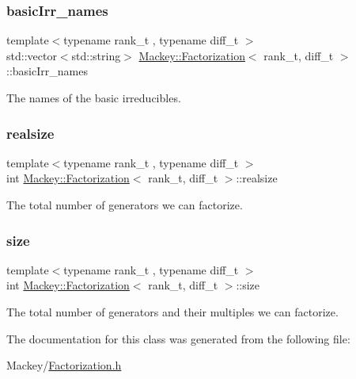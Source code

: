 \subsubsection{\texorpdfstring{basic\+Irr\+\_\+names}{basicIrr\_names}}
{\footnotesize\ttfamily template$<$typename rank\+\_\+t , typename diff\+\_\+t $>$ \\
std\+::vector$<$std\+::string$>$ \hyperlink{classMackey_1_1Factorization}{Mackey\+::\+Factorization}$<$ rank\+\_\+t, diff\+\_\+t $>$\+::basic\+Irr\+\_\+names}



The names of the basic irreducibles. 

\mbox{\label{classMackey_1_1Factorization_af5f29d56f33e4835aa699d9d6708b6c8}} 
\subsubsection{\texorpdfstring{realsize}{realsize}}
{\footnotesize\ttfamily template$<$typename rank\+\_\+t , typename diff\+\_\+t $>$ \\
int \hyperlink{classMackey_1_1Factorization}{Mackey\+::\+Factorization}$<$ rank\+\_\+t, diff\+\_\+t $>$\+::realsize}



The total number of generators we can factorize. 

\mbox{\label{classMackey_1_1Factorization_ab958c9491e2e63d0861d92599b0d237d}} 
\subsubsection{\texorpdfstring{size}{size}}
{\footnotesize\ttfamily template$<$typename rank\+\_\+t , typename diff\+\_\+t $>$ \\
int \hyperlink{classMackey_1_1Factorization}{Mackey\+::\+Factorization}$<$ rank\+\_\+t, diff\+\_\+t $>$\+::size}



The total number of generators and their multiples we can factorize. 



The documentation for this class was generated from the following file\+:\begin{DoxyCompactItemize}
\item 
Mackey/\hyperlink{Factorization_8h}{Factorization.\+h}\end{DoxyCompactItemize}
